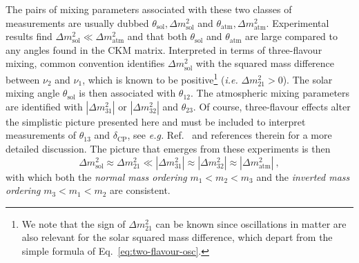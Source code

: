  The pairs of mixing parameters associated with these two classes of
  measurements are usually dubbed
  $\theta_{\text{sol}}, \Delta m^{2}_{\text{sol}}$ and
  $\theta_{\text{atm}}, \Delta m^{2}_{\text{atm}}$. Experimental results find
  $\Delta m^{2}_{\text{sol}} \ll \Delta m^{2}_{\text{atm}}$ and that both
  $\theta_{\text{sol}}$ and $\theta_{\text{atm}}$ are large compared to any
  angles found in the CKM matrix. Interpreted in terms of three-flavour mixing,
  common convention identifies $\Delta m_{\text{sol}}^{2}$ with the squared mass
  difference between $\nu_{2}$ and $\nu_{1}$, which is known to be
  positive\footnote{We note that the sign of $\Delta m_{21}^{2}$ can be known
    since oscillations in matter are also relevant for the solar squared mass
    difference, which depart from the simple formula of
    Eq.~\eqref{eq:two-flavour-osc}.} (\textit{i.e.} $\Delta m^{2}_{21} > 0$).
  The solar mixing angle $\theta_{\text{sol}}$ is then associated with
  $\theta_{12}$. The atmospheric mixing parameters are identified with
  $|\Delta m_{31}^{2}|$ or $|\Delta m_{32}^{2}|$ and $\theta_{23}$. Of course,
  three-flavour effects alter the simplistic picture presented here and must be
  included to interpret measurements of $\theta_{13}$ and $\delta_{\text{CP}}$,
  see \textit{e.g.} Ref.~\cite{Giganti:2017fhf} and references therein for a
  more detailed discussion. The picture that emerges from these experiments is
  then
  \begin{equation}
    \Delta m^{2}_{\text{sol}} \approx \Delta m^{2}_{21} \ll |\Delta m_{31}^{2}| \approx |\Delta m_{32}^{2}| \approx |\Delta m_{\text{atm}}^{2}| \ ,
  \end{equation}
  with which both the \textit{normal mass ordering} $m_{1} < m_{2} < m_{3}$ and
  the \textit{inverted mass ordering} $m_{3} < m_{1} < m_{2}$ are consistent.

